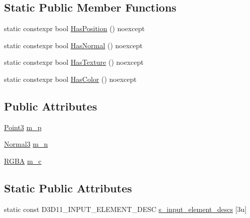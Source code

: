 \subsection*{Static Public Member Functions}
\begin{DoxyCompactItemize}
\item 
static constexpr bool \mbox{\hyperlink{structmage_1_1rendering_1_1_vertex_position_normal_color_a1a40ced9702b3aa3a8f32ea932448aa1}{Has\+Position}} () noexcept
\item 
static constexpr bool \mbox{\hyperlink{structmage_1_1rendering_1_1_vertex_position_normal_color_a663883aaff79837d1abb1c5cb54d2340}{Has\+Normal}} () noexcept
\item 
static constexpr bool \mbox{\hyperlink{structmage_1_1rendering_1_1_vertex_position_normal_color_aef3b7dd4f11d7f2a78fe29c49b8bf6f5}{Has\+Texture}} () noexcept
\item 
static constexpr bool \mbox{\hyperlink{structmage_1_1rendering_1_1_vertex_position_normal_color_ae1d38a1d2e3f546c475849ec360f5317}{Has\+Color}} () noexcept
\end{DoxyCompactItemize}
\subsection*{Public Attributes}
\begin{DoxyCompactItemize}
\item 
\mbox{\hyperlink{structmage_1_1_point3}{Point3}} \mbox{\hyperlink{structmage_1_1rendering_1_1_vertex_position_normal_color_ad89961e1a0b0bd97f580a34709e4e05f}{m\+\_\+p}}
\item 
\mbox{\hyperlink{structmage_1_1_normal3}{Normal3}} \mbox{\hyperlink{structmage_1_1rendering_1_1_vertex_position_normal_color_abf35d5cb0057f76dbd6f153ee0f412f4}{m\+\_\+n}}
\item 
\mbox{\hyperlink{structmage_1_1_r_g_b_a}{R\+G\+BA}} \mbox{\hyperlink{structmage_1_1rendering_1_1_vertex_position_normal_color_a41410eb9dab6e73b59aac40b69637c05}{m\+\_\+c}}
\end{DoxyCompactItemize}
\subsection*{Static Public Attributes}
\begin{DoxyCompactItemize}
\item 
static const D3\+D11\+\_\+\+I\+N\+P\+U\+T\+\_\+\+E\+L\+E\+M\+E\+N\+T\+\_\+\+D\+E\+SC \mbox{\hyperlink{structmage_1_1rendering_1_1_vertex_position_normal_color_a2b8768994f2e23a278f88a63b7e0364f}{s\+\_\+input\+\_\+element\+\_\+descs}} \mbox{[}3u\mbox{]}
\end{DoxyCompactItemize}


